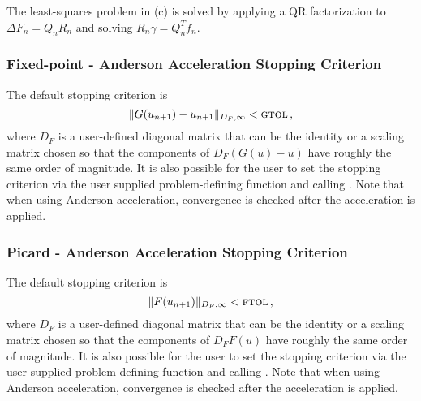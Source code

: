 The least-squares problem in (c) is solved by applying a QR factorization to
$\Delta F_n = Q_n R_n$ and solving $R_n \gamma = Q_n^T f_n$.


\subsubsection*{Fixed-point - Anderson Acceleration Stopping Criterion}

The default stopping criterion is 
\[ \|G(u_{n+1}) - u_{n+1} \|_{D_F,\infty} < \mbox{\sc gtol} \, , \]
where $D_F$ is a user-defined diagonal matrix that can be the identity 
or a scaling matrix chosen so that the components of $D_F (G(u)-u)$ have 
roughly the same order of magnitude.
It is also possible for the user to set the stopping criterion via the user 
supplied problem-defining function and calling .  
Note that when using Anderson acceleration, 
convergence is checked after the acceleration is applied.


\subsubsection*{Picard - Anderson Acceleration Stopping Criterion}

The default stopping criterion is 
\[ \|F(u_{n+1})\|_{D_F,\infty} < \mbox{\sc ftol} \, , \]
where $D_F$ is a user-defined diagonal matrix that can be the identity 
or a scaling matrix chosen so that the components of $D_F F(u)$ have 
roughly the same order of magnitude.
It is also possible for the user to set the stopping criterion via the user 
supplied problem-defining function and calling .  
Note that when using Anderson acceleration, 
convergence is checked after the acceleration is applied.




